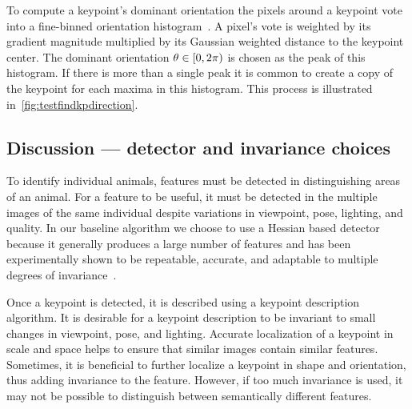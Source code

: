         To compute a keypoint's dominant orientation the pixels around a keypoint vote into a fine-binned
        orientation histogram~\cite{lowe_distinctive_2004}. A pixel's vote is weighted by its gradient magnitude
        multiplied by its Gaussian weighted distance to the keypoint center. The dominant orientation %
        $\theta \in [0,2\pi\rparen$ is chosen as the peak of this histogram. If there is more than a single peak
        it is common to create a copy of the keypoint for each maxima in this histogram. This process is
        illustrated in~\cref{fig:testfindkpdirection}.

        \testfindkpdirection{}

        \FloatBarrier{}


    \subsection{Discussion --- detector and invariance choices}
        To identify individual animals, features must be detected in distinguishing areas of an animal. For a
        feature to be useful, it must be detected in the multiple images of the same individual despite variations
        in viewpoint, pose, lighting, and quality. In our baseline algorithm we choose to use a Hessian based
        detector~\cite{perdoch_efficient_2009, lindeberg_feature_1998} because it generally produces a large number
        of features and has been experimentally shown to be repeatable, accurate, and adaptable to multiple degrees
        of invariance~\cite{tuytelaars_local_2007}.

        Once a keypoint is detected, it is described using a keypoint description algorithm. It is desirable for a
        keypoint description to be invariant to small changes in viewpoint, pose, and lighting. Accurate
        localization of a keypoint in scale and space helps to ensure that similar images contain similar features.
        Sometimes, it is beneficial to further localize a keypoint in shape and orientation, thus adding invariance
        to the feature. However, if too much invariance is used, it may not be possible to distinguish between
        semantically different features.

